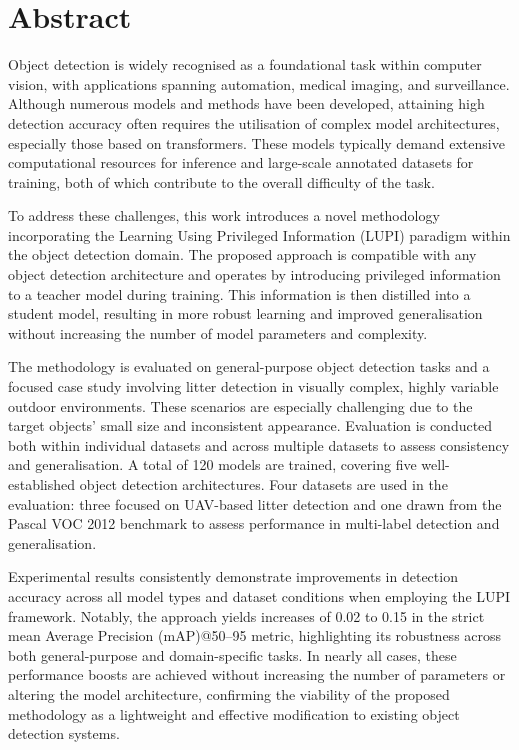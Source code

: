 \chapter*{Abstract}

Object detection is widely recognised as a foundational task within computer vision, with applications spanning automation, medical imaging, and surveillance. Although numerous models and methods have been developed, attaining high detection accuracy often requires the utilisation of complex model architectures, especially those based on transformers. These models typically demand extensive computational resources for inference and large-scale annotated datasets for training, both of which contribute to the overall difficulty of the task.

To address these challenges, this work introduces a novel methodology incorporating the Learning Using Privileged Information (LUPI) paradigm within the object detection domain. The proposed approach is compatible with any object detection architecture and operates by introducing privileged information to a teacher model during training. This information is then distilled into a student model, resulting in more robust learning and improved generalisation without increasing the number of model parameters and complexity.

The methodology is evaluated on general-purpose object detection tasks and a focused case study involving litter detection in visually complex, highly variable outdoor environments. These scenarios are especially challenging due to the target objects' small size and inconsistent appearance. Evaluation is conducted both within individual datasets and across multiple datasets to assess consistency and generalisation. A total of 120 models are trained, covering five well-established object detection architectures. Four datasets are used in the evaluation: three focused on UAV-based litter detection and one drawn from the Pascal VOC 2012 benchmark to assess performance in multi-label detection and generalisation.

Experimental results consistently demonstrate improvements in detection accuracy across all model types and dataset conditions when employing the LUPI framework. Notably, the approach yields increases of 0.02 to 0.15 in the strict mean Average Precision (mAP)@50--95 metric, highlighting its robustness across both general-purpose and domain-specific tasks. In nearly all cases, these performance boosts are achieved without increasing the number of parameters or altering the model architecture, confirming the viability of the proposed methodology as a lightweight and effective modification to existing object detection systems.


